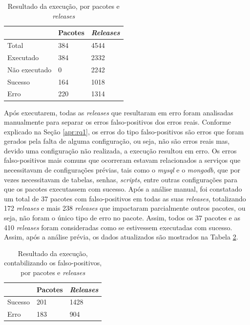 \begin{table}[]
\centering
\begin{tabular}{|l|l|l|}
\hline
                    & Pacotes & \textit{Releases} \\ \hline
    Total           & 384     & 4544     \\
    Executado       & 384     & 2332     \\
    Não executado   & 0       & 2242     \\
    Sucesso         & 164     & 1018     \\
    Erro            & 220     & 1314     \\ \hline
\end{tabular}
\caption{Resultado da execução, por pacotes e \textit{releases}}
\label{tab:res_rq1_1}
\end{table}

Após executarem, todas as \textit{releases} que resultaram em erro foram analisadas manualmente para separar os erros falso-positivos dos erros reais. Conforme explicado na Seção \ref{apr:rq1}, os erros do tipo falso-positivos são erros que foram gerados pela falta de alguma configuração, ou seja, não são erros reais mas, devido uma configuração não realizada, a execução resultou em erro. Os erros falso-positivos mais comuns que ocorreram estavam relacionados a serviços que necessitavam de configurações prévias, tais como o \textit{mysql} e o \textit{mongodb}, que por vezes necessitavam de tabelas, senhas, \textit{scripts}, entre outras configurações para que os pacotes executassem com sucesso. Após a análise manual, foi constatado um total de 37 pacotes com falso-positivos em todas as suas \textit{releases}, totalizando 172 \textit{releases} e mais 238 \textit{releases} que impactaram parcialmente outros pacotes, ou seja, não foram o único tipo de erro no pacote. Assim, todos os 37 pacotes e as 410 \textit{releases} foram consideradas como se estivessem executadas com sucesso. Assim, após a análise prévia, os dados atualizados são mostrados na Tabela \ref{tab:res_rq1_2}.

\begin{table}[]
\centering
\begin{tabular}{|l|l|l|}
\hline
                    & Pacotes & \textit{Releases} \\ \hline
    Sucesso         & 201     & 1428     \\
    Erro            & 183     & 904     \\ \hline
\end{tabular}
\caption{Resultado da execução, contabilizando os falso-positivos, por pacotes e \textit{releases}}
\label{tab:res_rq1_2}
\end{table}

